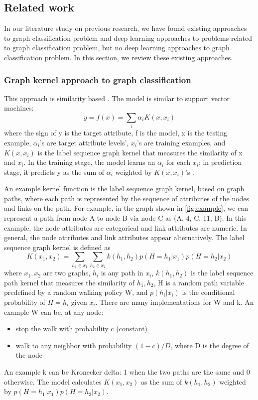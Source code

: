 \documentclass{article}
\begin{document}
\subsection{Related work}
In our literature study on previous research,
we have found existing approaches to graph classification problem
and deep learning approaches to problems related to graph classification problem,
but no deep learning approaches to graph classification problem.
In this section, we review these existing approaches.

\subsubsection{Graph kernel approach to graph classification}
This approach is similarity based \cite{kashima2003marginalized}.
The model is similar to support vector machines:
\[ y = f(x) = \sum_{i} \alpha_i K(x, x_i) \]
where the sign of y is the target attribute, f is the model,
x is the testing example, $ \alpha_i $'s are target attribute levels',
$ x_i $'s are training examples, and
$ K(x, x_i) $ is the label sequence graph kernel
that measures the similarity of x and $ x_i $.
In the training stage,
the model learns an $ \alpha_i $ for each $ x_i $;
in prediction stage,
it predicts y as 
the sum of $ \alpha_i $ weighted by $ K(x, x_i) $'s \cite{scholkopf2001learning}.

An example kernel function is the label sequence graph kernel,
based on graph paths,
where each path is represented by the sequence of attributes of the nodes and links
on the path.
For example, in the graph shown in \autoref{fig:example},
we can represent a path from node A to node B via node C as (A, 4, C, 11, B).
In this example, the node attributes are categorical and link attributes are numeric.
In general, the node attributes and link attributes appear alternatively.
The label sequence graph kernel is defined as
\[ K(x_1, x_2) =
\sum_{h_1 \in x_1} \sum_{h_2 \in x_2} 
k(h_1, h_2) p(H = h_1 | x_1) p(H = h_2 | x_2) \]
where $ x_1, x_2 $ are two graphs,
$ h_i $ is any path in $ x_i $,
$ k(h_1, h_2) $ is the label sequence path kernel
that measures the similarity of $ h_1, h_2 $,
H is a random path variable predefined by a random walking policy W, and
$ p(h_i | x_i) $ is the conditional probability of $ H = h_i $ given $ x_i $.
There are many implementations for W and k.
An example W can be, at any node:
\begin{itemize}
	\item stop the walk with probability c (constant)
	\item walk to any neighbor with probability $ (1 - c) / D $,
	where D is the degree of the node
\end{itemize}
An example k can be Kronecker delta: 1 when the two paths are the same and 0 otherwise.
The model calculates $ K(x_1, x_2) $ as
the sum of $ k(h_1, h_2) $ weighted by $ p(H = h_1 | x_1) p(H = h_2 | x_2) $.
\end{document}
